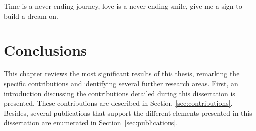 

\begin{savequote}[50mm]
Time is a never ending journey, love is a never ending smile, 
give me a sign to build a dream on.
\end{savequote}


\chapter{Conclusions}
\label{cha:Conclusions}

\ifpdf
    \graphicspath{{6_conclusion/figures/PDF/}}
\fi

This chapter reviews the most significant results of this thesis, remarking the 
specific contributions and identifying several further research areas. First, 
an introduction discussing the contributions detailed during this dissertation 
is presented. These contributions are described in Section~\ref{sec:contributions}. 
Besides, several publications that support the different elements presented in 
this dissertation are enumerated in Section~\ref{sec:publications}.





